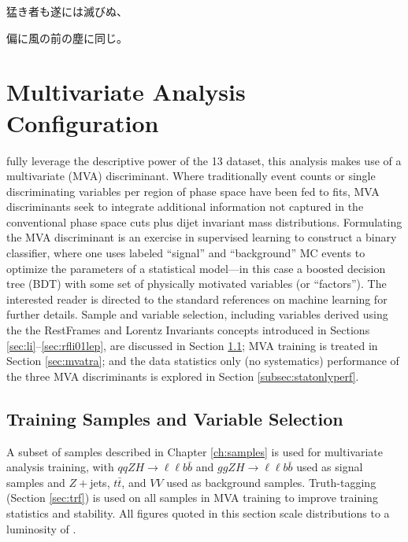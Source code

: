 \begin{savequote}[75mm]
猛き者も遂には滅びぬ、

偏に風の前の塵に同じ。
\end{savequote}

\chapter{Multivariate Analysis Configuration}
\label{ch:mva}
 fully leverage the descriptive power of the 13 \tev dataset, this analysis makes use of a multivariate (MVA) discriminant.  Where traditionally event counts or single discriminating variables per region of phase space have been fed to fits, MVA discriminants seek to integrate additional information not captured in the conventional phase space cuts plus dijet invariant mass distributions.  Formulating the MVA discriminant is an exercise in supervised learning to construct a binary classifier, where one uses labeled ``signal'' and ``background'' MC events to optimize the parameters of a statistical model---in this case a boosted decision tree (BDT) with some set of physically motivated variables (or ``factors'').  The interested reader is directed to the standard references on machine learning for further details.  Sample and variable selection, including variables derived using the the RestFrames and Lorentz Invariants concepts introduced in Sections \ref{sec:li}--\ref{sec:rfli01lep}, are discussed in Section \ref{sec:samvar}; MVA training is treated in Section \ref{sec:mvatra}; and the data statistics only (no systematics) performance of the three MVA discriminants is explored in Section \ref{subsec:statonlyperf}.

\section{Training Samples and Variable Selection}
\label{sec:samvar}
A subset of samples described in Chapter \ref{ch:samples} is used for multivariate analysis training, with $qqZH\to\ell\ell b\bar{b}$ and $ggZH\to\ell\ell b\bar{b}$ used as signal samples and $Z+$jets, $t\bar{t}$, and $VV$ used as background samples.  Truth-tagging (Section \ref{sec:trf}) is used on all samples in MVA training to improve training statistics and stability.  All figures quoted in this section scale distributions to a luminosity of \LUMI.

